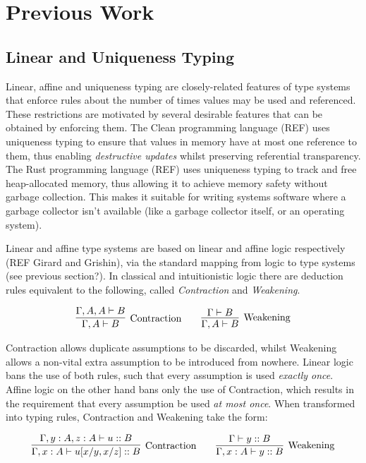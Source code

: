 \documentclass[]{unswthesis}
\begin{document}
\section{Previous Work}

\subsection{Linear and Uniqueness Typing}

Linear, affine and uniqueness typing are closely-related features of type systems that enforce rules about the number of times values may be used and referenced. These restrictions are motivated by several desirable features that can be obtained by enforcing them. The Clean programming language (REF) uses uniqueness typing to ensure that values in memory have at most one reference to them, thus enabling \textit{destructive updates} whilst preserving referential transparency. The Rust programming language (REF) uses uniqueness typing to track and free heap-allocated memory, thus allowing it to achieve memory safety without garbage collection. This makes it suitable for writing systems software where a garbage collector isn't available (like a garbage collector itself, or an operating system).

Linear and affine type systems are based on linear and affine logic respectively (REF Girard and Grishin), via the standard mapping from logic to type systems (see previous section?). In classical and intuitionistic logic there are deduction rules equivalent to the following, called \textit{Contraction} and \textit{Weakening}.

\begin{eqnarray*}
\infer[\text{Contraction}]{\Gamma, A \vdash B}{
	\Gamma, A, A \vdash B
}
\qquad
\infer[\text{Weakening}]{\Gamma, A \vdash B}{
    \Gamma \vdash B
}
\end{eqnarray*}

Contraction allows duplicate assumptions to be discarded, whilst Weakening allows a non-vital extra assumption to be introduced from nowhere. Linear logic bans the use of both rules, such that every assumption is used \textit{exactly once}. Affine logic on the other hand bans only the use of Contraction, which results in the requirement that every assumption be used \textit{at most once}. When transformed into typing rules, Contraction and Weakening take the form:

\begin{eqnarray*}
\infer[\text{Contraction}]{\Gamma, x : A \vdash u[x/y, x/z] :: B}{
	\Gamma, y : A, z : A \vdash u :: B
}
\qquad
\infer[\text{Weakening}]{\Gamma, x : A \vdash y :: B}{
    \Gamma\vdash y :: B
}
\end{eqnarray*}
\end{document}
